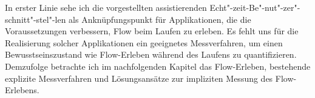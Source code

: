 In erster Linie sehe ich die vorgestellten assistierenden Echt"-zeit-Be"-nut"-zer"-schnitt"-stel"-len als Anknüpfungspunkt für Applikationen, die die Voraussetzungen verbessern, Flow beim Laufen zu erleben. Es fehlt uns für die Realisierung solcher Applikationen ein geeignetes Messverfahren, um einen Bewusstseinszustand wie Flow-Erleben während des Laufens zu quantifizieren. Demzufolge betrachte ich im nachfolgenden Kapitel das Flow-Erleben, bestehende explizite Messverfahren und Lösungsansätze zur impliziten Messung des Flow-Erlebens.